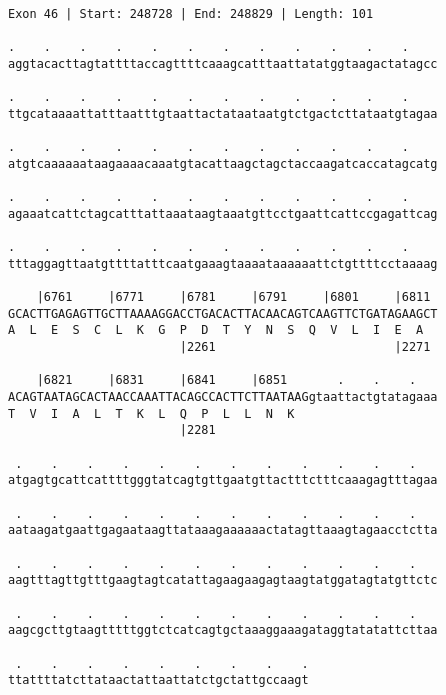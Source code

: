 \documentclass{article}
\begin{document}
\newpage
\begin{Verbatim}
Exon 46 | Start: 248728 | End: 248829 | Length: 101
 
.    .    .    .    .    .    .    .    .    .    .    .    
aggtacacttagtattttaccagttttcaaagcatttaattatatggtaagactatagcc
  
.    .    .    .    .    .    .    .    .    .    .    .    
ttgcataaaattatttaatttgtaattactataataatgtctgactcttataatgtagaa
  
.    .    .    .    .    .    .    .    .    .    .    .    
atgtcaaaaaataagaaaacaaatgtacattaagctagctaccaagatcaccatagcatg
  
.    .    .    .    .    .    .    .    .    .    .    .    
agaaatcattctagcatttattaaataagtaaatgttcctgaattcattccgagattcag
  
.    .    .    .    .    .    .    .    .    .    .    .    
tttaggagttaatgttttatttcaatgaaagtaaaataaaaaattctgttttcctaaaag
  
    |6761     |6771     |6781     |6791     |6801     |6811 
GCACTTGAGAGTTGCTTAAAAGGACCTGACACTTACAACAGTCAAGTTCTGATAGAAGCT
A  L  E  S  C  L  K  G  P  D  T  Y  N  S  Q  V  L  I  E  A  
                        |2261                         |2271 
  
    |6821     |6831     |6841     |6851       .    .    .   
ACAGTAATAGCACTAACCAAATTACAGCCACTTCTTAATAAGgtaattactgtatagaaa
T  V  I  A  L  T  K  L  Q  P  L  L  N  K                    
                        |2281                               
  
 .    .    .    .    .    .    .    .    .    .    .    .   
atgagtgcattcattttgggtatcagtgttgaatgttactttctttcaaagagtttagaa
  
 .    .    .    .    .    .    .    .    .    .    .    .   
aataagatgaattgagaataagttataaagaaaaaactatagttaaagtagaacctctta
  
 .    .    .    .    .    .    .    .    .    .    .    .   
aagtttagttgtttgaagtagtcatattagaagaagagtaagtatggatagtatgttctc
  
 .    .    .    .    .    .    .    .    .    .    .    .   
aagcgcttgtaagtttttggtctcatcagtgctaaaggaaagataggtatatattcttaa
  
 .    .    .    .    .    .    .    .    .
ttattttatcttataactattaattatctgctattgccaagt
\end{Verbatim}
\newpage
\end{document}
